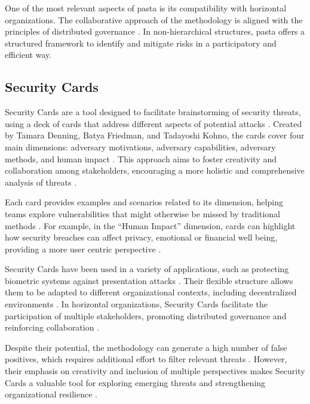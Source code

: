 One of the most relevant aspects of \gls{pasta} is its compatibility with
horizontal organizations. The collaborative approach of the methodology is
aligned with the principles of distributed governance \cite{Colbac}. In non-hierarchical
structures, \gls{pasta} offers a structured framework to identify and mitigate
risks in a participatory and efficient way.

\subsection{Security Cards}
\label{subsec:security_cards}

Security Cards are a tool designed to facilitate brainstorming of security
threats, using a deck of cards that address different aspects of potential
attacks \cite{SecurityCardsToolkit}. Created by Tamara Denning, Batya Friedman,
and Tadayoshi Kohno, the cards cover four main dimensions: adversary
motivations, adversary capabilities, adversary methods, and human impact
\cite{KeepingAheadofOurAdversaries}. This approach aims to foster creativity and
collaboration among stakeholders, encouraging a more holistic and comprehensive
analysis of threats \cite{CyberThreatModeling}.

Each card provides examples and scenarios related to its dimension, helping
teams explore vulnerabilities that might otherwise be missed by traditional
methods \cite{SecurityCardsToolkit}. For example, in the “Human Impact”
dimension, cards can highlight how security breaches can affect privacy,
emotional or financial well being, providing a more user centric perspective
\cite{KeepingAheadofOurAdversaries}.

Security Cards have been used in a variety of applications, such as protecting
biometric systems against presentation attacks
\cite{AttackTreesforProtectingBiometric, KeepingAheadofOurAdversaries}. Their
flexible structure allows them to be adapted to different organizational
contexts, including decentralized environments
\cite{ParticipatoryThreatModelling}. In horizontal organizations, Security Cards
facilitate the participation of multiple stakeholders, promoting distributed
governance and reinforcing collaboration \cite{CyberThreatModeling}.

Despite their potential, the methodology can generate a high number of false
positives, which requires additional effort to filter relevant threats
\cite{KeepingAheadofOurAdversaries}. However, their emphasis on creativity and
inclusion of multiple perspectives makes Security Cards a valuable tool for
exploring emerging threats and strengthening organizational resilience
\cite{CyberThreatModeling}.

